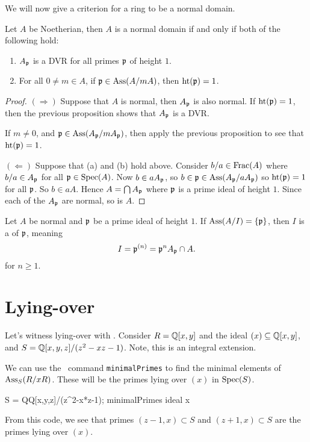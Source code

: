 \documentclass{ximera}
\begin{document}
We will now give a criterion for a ring to be a normal domain.

\begin{theorem}
  Let $A$ be Noetherian, then $A$ is a normal domain if and only if
  both of the following hold:
  \begin{enumerate}
  \item $A_{\mathfrak{p}}$ is a DVR for all primes $\mathfrak{p}$ of height $1$.
  \item For all $0 \neq m \in A$, if $\mathfrak{p} \in \operatorname{Ass}(A/mA)$, then $\operatorname{ht}(\mathfrak{p}) = 1$.
  \end{enumerate}
  \begin{proof}
    $(\Rightarrow)$ Suppose that $A$ is normal, then $A_{\mathfrak{p}}$ is also
    normal. If $\operatorname{ht}(\mathfrak{p}) = 1$, then the previous proposition shows that
    $A_{\mathfrak{p}}$ is a DVR.

    If $m\ne 0$, and $\mathfrak{p} \in \operatorname{Ass}(A_{\mathfrak{p}}/mA_{\mathfrak{p}})$, then apply the previous
    proposition to see that $\operatorname{ht}(\mathfrak{p}) = 1$.

    $(\Leftarrow)$ Suppose that (a) and (b) hold above. Consider
    $b/a\in\operatorname{Frac}(A)$ where $b/a\in A_{\mathfrak{p}}$ for all $\mathfrak{p}\in\operatorname{Spec}(A)$. Now
    $b\in a A_{\mathfrak{p}}$, so $b\in \mathfrak{p}\in \operatorname{Ass}(A_{\mathfrak{p}}/aA_{\mathfrak{p}})$ so $\operatorname{ht}(\mathfrak{p}) = 1$
    for all $\mathfrak{p}$.  So $b\in a A$. Hence $A = \bigcap A_{\mathfrak{p}}$ where $\mathfrak{p}$
    is a prime ideal of height $1$. Since each of the $A_{\mathfrak{p}}$ are
    normal, so is $A$.
  \end{proof}
\end{theorem}


\begin{corollary}
  Let $A$ be normal and $\mathfrak{p}$ be a prime ideal of height $1$. If
  $\operatorname{Ass}(A/I) = \{\mathfrak{p}\}$, then $I$ is a  of $\mathfrak{p}$,
  meaning
  \[
  I = \mathfrak{p}^{(n)} = \mathfrak{p}^n A_{\mathfrak{p}} \cap A.
  \]
  for  $n\ge 1$.
\end{corollary}



\section{Lying-over}

Let's witness lying-over with \macaulay.  Consider $R=\mathbb Q[x,y]$ and the
ideal $(x)\subseteq \mathbb Q[x,y]$, and $S = \mathbb Q[x,y,z]/(z^2 -xz -1)$. Note,
this is an integral extension.

We can use the \macaulay\ command \texttt{minimalPrimes} to find the
minimal elements of $\operatorname{Ass}_S(R/xR)$. These will be the primes lying
over $(x)$ in $\operatorname{Spec}(S)$.
\begin{macaulay2}
S = QQ[x,y,z]/(z^2-x*z-1);
minimalPrimes ideal x
\end{macaulay2}

From this code, we see that primes $(z-1,x)\subset S$ and
$(z+1,x)\subset S$ are the primes lying over $(x)$.






\end{document}
